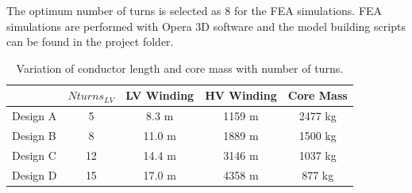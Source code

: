 \documentclass[a4paper, 11pt]{article} %
\begin{document}
The optimum number of turns is selected as 8 for the FEA simulations. FEA simulations are performed with Opera 3D software and the model building scripts can be found in the project folder.

\begin{table}[]
\begin{center}
\begin{tabular}{lcccc}
& $Nturns_{LV}$ & LV Winding & HV Winding & Core Mass \\
\hline
Design A & 5 & 8.3 m & 1159 m & 2477 kg \\
Design B & 8 & 11.0 m & 1889 m & 1500 kg \\
Design C & 12 & 14.4 m & 3146 m & 1037 kg \\
Design D & 15 & 17.0 m & 4358 m & 877 kg \\
\hline
\end{tabular} 
\end{center}
\caption{Variation of conductor length and core mass with number of turns.}
\label{conductor_length}
\end{table}
\end{document}
